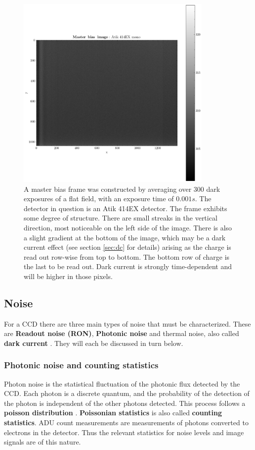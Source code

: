 \documentclass[../main.tex]{subfiles}
\begin{document}
	\begin{figure}[h!]
		\centering
		\includegraphics[width	=0.85\textwidth]{master_bias.png}
		\caption{A master bias frame was constructed by averaging over $300$ dark exposures of a flat field, with an exposure time of $0.001s$. The detector in question is an Atik 414EX detector. The frame exhibits some degree of structure. There are small streaks in the vertical direction, most noticeable on the left side of the image. There is also a slight gradient at the bottom of the image, which may be a dark current effect (see section \ref{sec:dc} for details) arising as the charge is read out row-wise from top to bottom. The bottom row of charge is the last to be read out. Dark current is strongly time-dependent and will be higher in those pixels.}
		\label{fig:masterbias}
	\end{figure}
	
	
	\subsection{Noise}
	For a CCD there are three main types of noise that must be characterized. These are \textbf{Readout noise (RON)}, \textbf{Photonic noise} and thermal noise, also called \textbf{dark current} \cite{handbookofccdastronomy}. They will each be discussed in turn below. 
	
	\subsubsection{Photonic noise and counting statistics}\label{sect:photonicnoise}
	Photon noise is the statistical fluctuation of the photonic flux detected by the CCD. Each photon is a discrete quantum, and the probability of the detection of the photon is independent of the other photons detected. This process follows a \textbf{poisson distribution} \cite{photonnoise}. \textbf{Poissonian statistics} is also called \textbf{counting statistics}. ADU count measurements are measurements of photons converted to electrons in the detector. Thus the relevant statistics for noise levels and image signals are of this nature.
	
\end{document}
